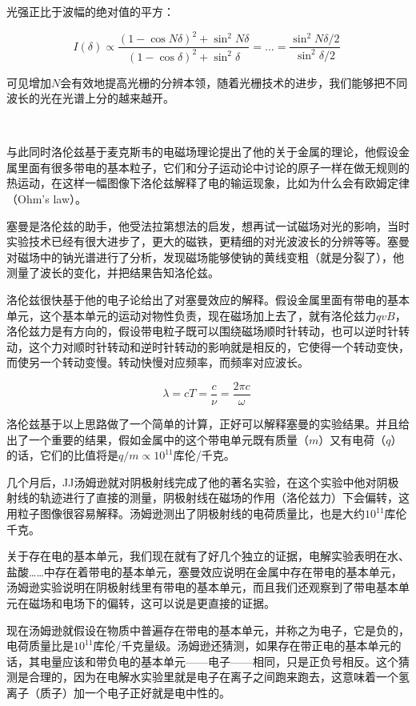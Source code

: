 光强正比于波幅的绝对值的平方：

\begin{equation}
I(\delta) \propto \frac{( 1 - \cos N \delta)^2 + \sin^2 N \delta  }{  (1 - \cos \delta)^2 + \sin^2 \delta } = ... = \frac{\sin^2 N\delta /2}{\sin^2 \delta /2} ~
\end{equation}

可见增加$N$会有效地提高光栅的分辨本领，随着光栅技术的进步，我们能够把不同波长的光在光谱上分的越来越开。

~

与此同时洛伦兹基于麦克斯韦的电磁场理论提出了他的关于金属的理论，他假设金属里面有很多带电的基本粒子，它们和分子运动论中讨论的原子一样在做无规则的热运动，在这样一幅图像下洛伦兹解释了电的输运现象，比如为什么会有欧姆定律（Ohm's law）。

塞曼是洛伦兹的助手，他受法拉第想法的启发，想再试一试磁场对光的影响，当时实验技术已经有很大进步了，更大的磁铁，更精细的对光波波长的分辨等等。塞曼对磁场中的钠光谱进行了分析，发现磁场能够使钠的黄线变粗（就是分裂了），他测量了波长的变化，并把结果告知洛伦兹。

洛伦兹很快基于他的电子论给出了对塞曼效应的解释。假设金属里面有带电的基本单元，这个基本单元的运动对物性负责，现在磁场加上去了，就有洛伦兹力$q v B$，洛伦兹力是有方向的，假设带电粒子既可以围绕磁场顺时针转动，也可以逆时针转动，这个力对顺时针转动和逆时针转动的影响就是相反的，它使得一个转动变快，而使另一个转动变慢。转动快慢对应频率，而频率对应波长。

\begin{equation}
\lambda = c T = \frac{c }{\nu} = \frac{2 \pi c}{ \omega }~
\end{equation}

洛伦兹基于以上思路做了一个简单的计算，正好可以解释塞曼的实验结果。并且给出了一个重要的结果，假如金属中的这个带电单元既有质量（$m$）又有电荷（$q$）的话，它们的比值将是$q/m \propto 10^{11} $库伦/千克。

几个月后，JJ汤姆逊就对阴极射线完成了他的著名实验，在这个实验中他对阴极射线的轨迹进行了直接的测量，阴极射线在磁场的作用（洛伦兹力）下会偏转，这用粒子图像很容易解释。汤姆逊测出了阴极射线的电荷质量比，也是大约$10^{11}$库伦千克。

关于存在电的基本单元，我们现在就有了好几个独立的证据，电解实验表明在水、盐酸……中存在着带电的基本单元，塞曼效应说明在金属中存在带电的基本单元，汤姆逊实验说明在阴极射线里有带电的基本单元，而且我们还观察到了带电基本单元在磁场和电场下的偏转，这可以说是更直接的证据。

现在汤姆逊就假设在物质中普遍存在带电的基本单元，并称之为电子，它是负的，电荷质量比是$10^{11}$库伦/千克量级。汤姆逊还猜测，如果存在带正电的基本单元的话，其电量应该和带负电的基本单元——电子——相同，只是正负号相反。这个猜测是合理的，因为在电解水实验里就是电子在离子之间跑来跑去，这意味着一个氢离子（质子）加一个电子正好就是电中性的。

